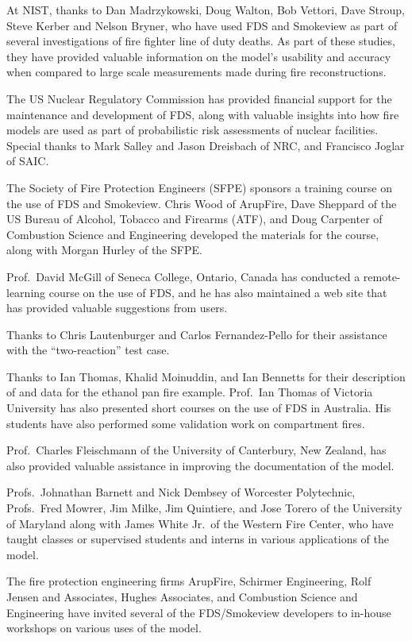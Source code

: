 \documentclass[11pt]{book}
\begin{document}
At NIST, thanks to Dan Madrzykowski, Doug Walton, Bob Vettori, Dave Stroup, Steve Kerber and Nelson Bryner,
who have used FDS and Smokeview as part of several investigations of fire fighter line of duty deaths.
As part of these studies, they have provided valuable information on the model's usability and accuracy
when compared to large scale measurements made during fire reconstructions.

The US Nuclear Regulatory Commission has provided financial support for the maintenance and development of FDS,
along with valuable insights into how fire models are used as part of probabilistic risk assessments of nuclear
facilities. Special thanks to Mark Salley and Jason Dreisbach of NRC, and Francisco Joglar of SAIC.

The Society of Fire Protection Engineers (SFPE) sponsors a training course on the use of FDS and Smokeview.
Chris Wood of ArupFire, Dave Sheppard of the US Bureau of Alcohol, Tobacco and Firearms (ATF), and
Doug Carpenter of Combustion Science and Engineering developed the materials for the course, along with
Morgan Hurley of the SFPE.

Prof.~David McGill of Seneca College, Ontario, Canada has conducted a remote-learning course
on the use of FDS, and he has also maintained a web site that has provided valuable suggestions from users.

Thanks to Chris Lautenburger and Carlos Fernandez-Pello for their assistance with the ``two-reaction'' test case.

Thanks to Ian Thomas, Khalid Moinuddin, and Ian Bennetts for their description of and data for the ethanol pan fire example.
Prof.~Ian Thomas of Victoria University has also presented short courses on the use of FDS in Australia.
His students have also performed some validation work on compartment fires.

Prof.~Charles Fleischmann of the University of Canterbury, New Zealand, has also provided valuable assistance
in improving the documentation of the model.

Profs.~Johnathan Barnett and Nick Dembsey of Worcester Polytechnic, Profs.~Fred Mowrer, Jim Milke, Jim Quintiere,
and Jose Torero of the University of Maryland along with James White Jr.~of the Western Fire Center, who have taught
classes or supervised students and interns in various applications of the model.

The fire protection engineering firms ArupFire, Schirmer Engineering, Rolf Jensen and Associates, Hughes Associates,
and Combustion Science and Engineering have invited several of the FDS/Smokeview developers to in-house workshops
on various uses of the model.
\end{document}
